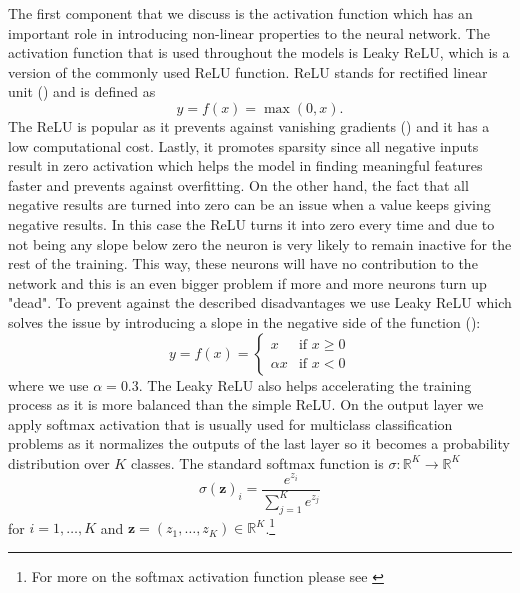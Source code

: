 \documentclass[11pt, a4paper]{article}
\begin{document}
The first component that we discuss is the activation function which has an important role in introducing non-linear properties to the neural network. The activation function that is used throughout the models is Leaky ReLU, which is a version of the commonly used ReLU function. ReLU stands for rectified linear unit (\cite{hahnloser2000digital}) and is defined as
\begin{equation}
    \label{eq:ReLU}
    y = f(x) = \max(0,x).
\end{equation}
The ReLU is popular as it prevents against vanishing gradients (\cite{glorot2011deep}) and it has a low computational cost. Lastly, it promotes sparsity since all negative inputs result in zero activation which helps the model in finding meaningful features faster and prevents against overfitting. 
On the other hand, the fact that all negative results are turned into zero can be an issue when a value keeps giving negative results. In this case the ReLU turns it into zero every time and due to not being any slope below zero the neuron is very likely to remain inactive for the rest of the training. This way, these neurons will have no contribution to the network and this is an even bigger problem if more and more neurons turn up "dead". To prevent against the described disadvantages we use Leaky ReLU which solves the issue by introducing a slope in the negative side of the function (\cite{maas2013rectifier}):
\begin{equation}
    \label{eq:LeakyReLU}
    y = f(x) = 
   \begin{cases*}
      x & \text{if $x \geq 0$} \\
      \alpha x        & \text{if $x<0$}
    \end{cases*}
\end{equation}
where we use $\alpha = 0.3$. The Leaky ReLU also helps accelerating the training process as it is more balanced than the simple ReLU. On the output layer we apply softmax activation that is usually used for multiclass classification problems as it normalizes the outputs of the last layer so it becomes a probability distribution over $K$ classes. The standard softmax function is $\sigma: \mathbb{R}^K \rightarrow \mathbb{R}^K$
\begin{equation}
    \label{eq:softmax}
    \sigma(\mathbf{z})_i = \frac{e^{z_i}}{\sum_{j=1}^K e^{z_j}} 
\end{equation}
for $i = 1,\dots, K$ and $\mathbf{z} = (z_1, \dots, z_K) \in \mathbb{R}^K$.\footnote{For more on the softmax activation function please see \cite{nielsen2015neural}}
\end{document}

